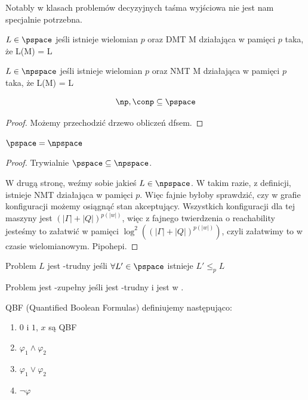 Notably w klasach problemów decyzyjnych taśma wyjściowa nie jest nam specjalnie potrzebna.

\begin{definition}
     \(L \in \pspace\) jeśli istnieje wielomian \( p \) oraz DMT M działająca w pamięci \(p\) taka, że L(M) = L
\end{definition}

\begin{definition}
     \(L \in \npspace\) jeśli istnieje wielomian \( p \) oraz NMT M działająca w pamięci \(p\) taka, że L(M) = L
\end{definition}

\begin{lemma}
    \[ \np, \conp \subseteq \pspace \]
\end{lemma}
\begin{proof}
    Możemy przechodzić drzewo obliczeń dfsem.
\end{proof}

\begin{lemma}
    \( \pspace = \npspace \)
\end{lemma}

\begin{proof}
    Trywialnie \( \pspace \subseteq \npspace \).
    
    W drugą stronę, weźmy sobie jakieś \( L \in 
\npspace \). W takim razie, z definicji, istnieje NMT działająca w pamięci \(p\). Więc fajnie byłoby sprawdzić, czy w grafie konfiguracji możemy osiągnąć stan akceptujący. Wszystkich konfiguracji dla tej maszyny jest \( (|\Gamma| + |Q|)^{p(|w|)} \), więc z fajnego twierdzenia o reachability jesteśmy to załatwić w pamięci \( \log^2((|\Gamma| + |Q|)^{p(|w|)}) \), czyli załatwimy to w czasie wielomianowym. Pipohepi.
\end{proof}

\begin{definition}
     Problem \( L \) jest \pspace-trudny jeśli \(\forall L' \in \pspace \) istnieje \( L' \leq_{p} L \) 
\end{definition}

\begin{definition}
     Problem jest \pspace-zupełny jeśli jest \pspace-trudny i jest w \pspace. 
\end{definition}

\begin{definition}
     QBF (Quantified Boolean Formulas) definiujemy następująco: 
     
     \begin{enumerate}
         \item \(0\) i \(1\), \(x\) są QBF
         \item \(\varphi_1 \land \varphi_2\) 
         \item \(\varphi_1 \lor \varphi_2\)
         \item \(\lnot \varphi \)
         
     \end{enumerate}
\end{definition}


